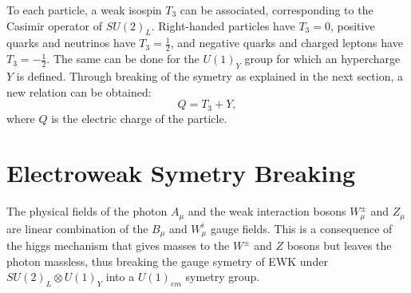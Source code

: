    To each particle, a weak isospin $ T_3 $ can be associated, corresponding to the Casimir operator of $ SU(2)_L $. Right-handed particles have $ T_3 = 0 $, positive quarks and neutrinos have $ T_3 = \frac{1}{2} $, and negative quarks and charged leptons have $ T_3 = - \frac{1}{2} $. The same can be done for the $ U(1)_Y $ group for which an hypercharge $ Y $ is defined. Through breaking of the symetry as explained in the next section, a new relation can be obtained:
    \begin{equation}
      Q = T_3 + Y ,
    \end{equation}
    where $ Q $ is the electric charge of the particle.

  \section{Electroweak Symetry Breaking}

    The physical fields of the photon $ A_\mu $ and the weak interaction bosons $ W^\pm_\mu $ and $ Z_\mu $ are linear combination of the $ B_\mu $ and $ W^i_\mu $ gauge fields. This is a consequence of the higgs mechanism that gives masses to the $ W^\pm $ and $ Z $ bosons but leaves the photon massless, thus breaking the gauge symetry of EWK under $ SU(2)_L \otimes U(1)_Y $ into a $ U(1)_{em} $ symetry group. \\

